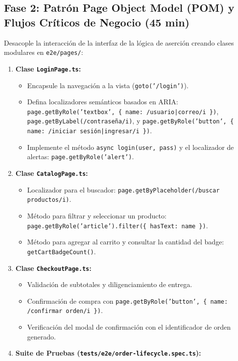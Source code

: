 \documentclass[10pt,letterpaper]{article}
\begin{document}
\subsection{Fase 2: Patrón Page Object Model (POM) y Flujos Críticos de Negocio (45 min)}
Desacople la interacción de la interfaz de la lógica de aserción creando clases modulares en \texttt{e2e/pages/}:
\begin{enumerate}[leftmargin=*,label=\textbf{\alph*)},itemsep=1.5pt,topsep=1.5pt]
  \item \textbf{Clase \texttt{LoginPage.ts}:}
    \begin{itemize}[itemsep=1pt]
      \item Encapsule la navegación a la vista (\texttt{goto('/login')}).
      \item Defina localizadores semánticos basados en ARIA: \texttt{page.getByRole('textbox', \{ name: /usuario|correo/i \})}, \texttt{page.getByLabel(/contraseña/i)}, y \texttt{page.getByRole('button', \{ name: /iniciar sesión|ingresar/i \})}.
      \item Implemente el método \texttt{async login(user, pass)} y el localizador de alertas: \texttt{page.getByRole('alert')}.
    \end{itemize}
  \item \textbf{Clase \texttt{CatalogPage.ts}:}
    \begin{itemize}[itemsep=1pt]
      \item Localizador para el buscador: \texttt{page.getByPlaceholder(/buscar productos/i)}.
      \item Método para filtrar y seleccionar un producto: \texttt{page.getByRole('article').filter(\{ hasText: name \})}.
      \item Método para agregar al carrito y consultar la cantidad del badge: \texttt{getCartBadgeCount()}.
    \end{itemize}
  \item \textbf{Clase \texttt{CheckoutPage.ts}:}
    \begin{itemize}[itemsep=1pt]
      \item Validación de subtotales y diligenciamiento de entrega.
      \item Confirmación de compra con \texttt{page.getByRole('button', \{ name: /confirmar orden/i \})}.
      \item Verificación del modal de confirmación con el identificador de orden generado.
    \end{itemize}
  \item \textbf{Suite de Pruebas (\texttt{tests/e2e/order-lifecycle.spec.ts}):}

\end{enumerate}
\end{document}
